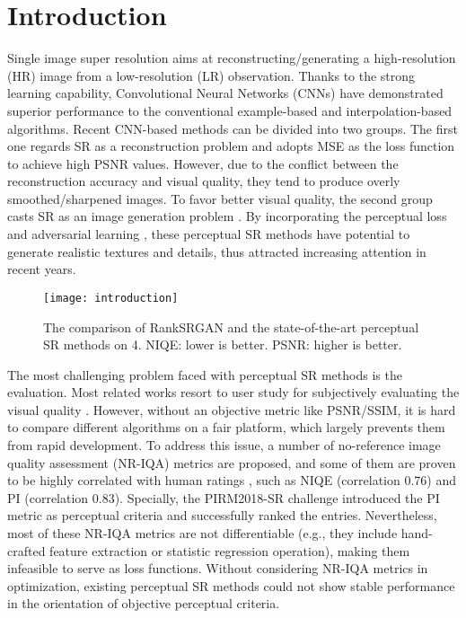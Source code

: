 \documentclass[10pt,twocolumn,letterpaper]{article}
\begin{document}
\section{Introduction}

Single image super resolution aims at reconstructing/generating a high-resolution (HR) image from a low-resolution (LR) observation. Thanks to the strong learning capability, Convolutional Neural Networks (CNNs) have demonstrated superior performance   \cite{dong2014learning,lim2017enhanced,zhang2018residual} to the conventional example-based \cite{zhang2012single} and interpolation-based \cite{zhang2006edge} algorithms. Recent CNN-based methods can be divided into two groups. The first one regards SR as a reconstruction problem and adopts MSE as the loss function to achieve high PSNR values. However, due to the conflict between the reconstruction accuracy and visual quality, they tend to produce overly smoothed/sharpened images. To favor better visual quality, the second group casts SR as an image generation problem \cite{ledig2017photo}. By incorporating the perceptual loss \cite{bruna2015super,johnson2016perceptual} and adversarial learning \cite{ledig2017photo}, these perceptual SR methods have potential to generate realistic textures and details, thus attracted increasing attention in recent years. 

\begin{figure}[t]
\setlength{\abovecaptionskip}{-0.3cm}
\setlength{\belowcaptionskip}{-0.24cm}
\begin{center}
\texttt{[image: introduction]} 

\end{center}
   \caption{The comparison of RankSRGAN and the state-of-the-art perceptual SR methods on 4. NIQE: lower is better. PSNR: higher is better.}
\label{fig:1}
\label{fig:onecol}
\vskip -0.5cm
\end{figure}
The most challenging problem faced with perceptual SR methods is the evaluation. Most related works resort to user study for subjectively evaluating the visual quality \cite{blau20182018, wang2018recovering}. However, without an objective metric like PSNR/SSIM, it is hard to compare different algorithms on a fair platform, which largely prevents them from rapid development. To address this issue, a number of no-reference image quality assessment (NR-IQA) metrics are proposed, and some of them are proven to be highly correlated with human ratings \cite{blau20182018}, such as NIQE \cite{mittal2013making} (correlation 0.76) and PI \cite{blau20182018} (correlation 0.83). Specially, the PIRM2018-SR challenge \cite{blau20182018} introduced the PI metric as perceptual criteria and successfully ranked the entries. Nevertheless, most of these NR-IQA metrics are not differentiable (e.g., they include hand-crafted feature extraction or statistic regression operation), making them infeasible to serve as loss functions. Without considering NR-IQA metrics in optimization, existing perceptual SR methods could not show stable performance in the orientation of objective perceptual criteria.
\end{document}
